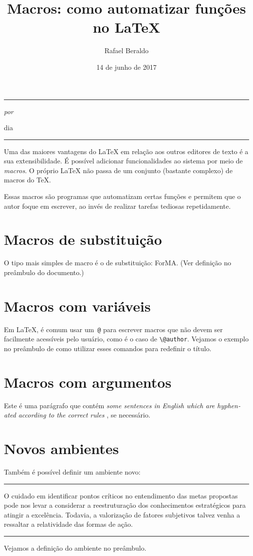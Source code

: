\documentclass[a4paper]{article}
\title{Macros: como automatizar funções no \LaTeX}
\author{Rafael Beraldo}
\date{14 de junho de 2017}
\makeatletter
\newcommand{\forma}{ForMA\xspace}
\newcommand{\eng}[1]{%
  \emph{\textenglish{#1}}%
}
\newenvironment{spotlight}
{
  \vspace{1em}
  \noindent\rule{\linewidth}{.5pt}\par\vspace{5pt}
  \noindent\ignorespaces
}
{
  \par
  \noindent\rule{\linewidth}{.5pt}
  \vspace{1em}\ignorespacesafterend
}
\renewcommand{\maketitle}{
  \begin{flushleft}
    \sffamily
    {\rule{\linewidth}{1pt}}
    {\Large\bfseries\@title\par}
    \medskip
    {\color{darkgray}\large\itshape por \@author{}\par
    dia \@date \par}
    {\rule{\linewidth}{1pt}}
    \bigskip
  \end{flushleft}
}
\makeatother
\begin{document}
\frenchspacing

\maketitle

Uma das maiores vantagens do \LaTeX{} em relação aos outros editores de texto é
a sua extensibilidade. É possível adicionar funcionalidades ao sistema por meio
de \emph{macros}. O próprio \LaTeX{} não passa de um conjunto (bastante
complexo) de macros do \TeX.

Essas macros são programas que automatizam certas funções e permitem que o
autor foque em escrever, ao invés de realizar tarefas tediosas repetidamente.

\section{Macros de substituição}

O tipo mais simples de macro é o de substituição: \forma. (Ver definição
no preâmbulo do documento.)

\section{Macros com variáveis}

Em \LaTeX, é comum usar um~\verb+@+ para escrever macros que não devem ser
facilmente acessíveis pelo usuário, como é o caso de \verb+\@author+. Vejamos o
exemplo no preâmbulo de como utilizar esses comandos para redefinir o título.

\section{Macros com argumentos}

Este é uma parágrafo que contém \eng{some sentences in English which are
hyphenated according to the correct rules}, se necessário.

\section{Novos ambientes}

Também é possível definir um ambiente novo:

\begin{spotlight}
  O cuidado em identificar pontos críticos no entendimento das metas propostas
  pode nos levar a considerar a reestruturação dos conhecimentos estratégicos
  para atingir a excelência. Todavia, a valorização de fatores subjetivos
  talvez venha a ressaltar a relatividade das formas de ação.
\end{spotlight}

Vejamos a definição do ambiente no preâmbulo.
\end{document}
